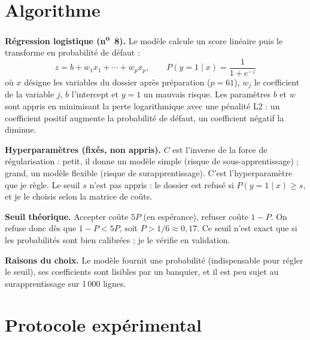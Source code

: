 \documentclass[11pt,a4paper]{article}
\begin{document}
\section{Algorithme}

\textbf{Régression logistique (n\textsuperscript{o}~8).} Le modèle calcule un score linéaire puis le transforme en probabilité de défaut :
\[
z = b + w_1 x_1 + \cdots + w_p x_p, \qquad P(y=1\mid x) = \frac{1}{1+e^{-z}}
\]
où $x$ désigne les variables du dossier après préparation ($p = 61$), $w_j$ le coefficient de la variable $j$, $b$ l'intercept et $y = 1$ un mauvais risque. Les paramètres $b$ et $w$ sont appris en minimisant la perte logarithmique avec une pénalité L2 : un coefficient positif augmente la probabilité de défaut, un coefficient négatif la diminue.

\textbf{Hyperparamètres (fixés, non appris).} $C$ est l'inverse de la force de régularisation : petit, il donne un modèle simple (risque de sous-apprentissage) ; grand, un modèle flexible (risque de surapprentissage). C'est l'hyperparamètre que je règle. Le seuil $s$ n'est pas appris : le dossier est refusé si $P(y=1\mid x)\geq s$, et je le choisis selon la matrice de coûts.

\textbf{Seuil théorique.} Accepter coûte $5P$ (en espérance), refuser coûte $1-P$. On refuse donc dès que $1-P < 5P$, soit $P > 1/6 \approx 0{,}17$. Ce seuil n'est exact que si les probabilités sont bien calibrées ; je le vérifie en validation.

\textbf{Raisons du choix.} Le modèle fournit une probabilité (indispensable pour régler le seuil), ses coefficients sont lisibles par un banquier, et il est peu sujet au surapprentissage sur 1\,000 lignes.

\section{Protocole expérimental}
\end{document}
